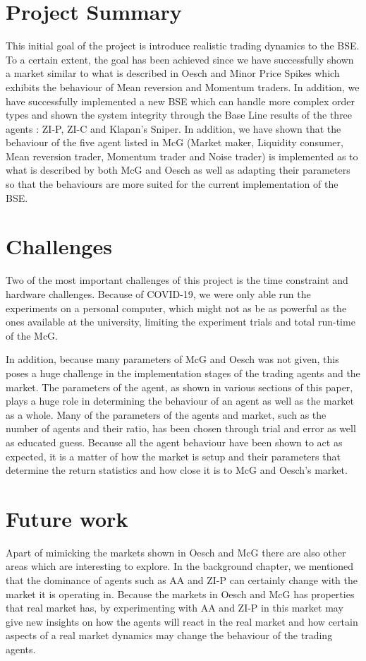 \section{Project Summary}

This initial goal of the project is introduce realistic trading dynamics to the BSE. To a certain extent, the goal has been achieved since we have successfully shown a market similar to what is described in Oesch \cite{Oesch} and Minor Price Spikes which exhibits the behaviour of Mean reversion and Momentum traders. In addition, we have successfully implemented a new BSE which can handle more complex order types and shown the system integrity through the Base Line results of the three agents : ZI-P, ZI-C and Klapan's Sniper. In addition, we have shown that the behaviour of the five agent listed in McG (Market maker, Liquidity consumer, Mean reversion trader, Momentum trader and Noise trader) is implemented as to what is described by both McG and Oesch as well as adapting their parameters so that the behaviours are more suited for the current implementation of the BSE. 

\section{Challenges}
Two of the most important challenges of this project is the time constraint and hardware challenges. Because of COVID-19, we were only able run the experiments on a personal computer, which might not as be as powerful as the ones available at the university, limiting the experiment trials and total run-time of the McG. 

In addition, because many parameters of McG and Oesch was not given, this poses a huge challenge in the implementation stages of the trading agents and the market. The parameters of the agent, as shown in various sections of this paper, plays a huge role in determining the behaviour of an agent as well as the market as a whole. Many of the parameters of the agents and market, such as the number of agents and their ratio, has been chosen through trial and error as well as educated guess. Because all the agent behaviour have been shown to act as expected, it is a matter of how the market is setup and their parameters that determine the return statistics and how close it is to McG and Oesch's market. 

\section{Future work}
Apart of mimicking the markets shown in Oesch and McG there are also other areas which are interesting to explore. In the background chapter, we mentioned that the dominance of agents such as AA and ZI-P can certainly change with the market it is operating in. Because the markets in Oesch and McG has properties that real market has, by experimenting with AA and ZI-P in this market may give new insights on how the agents will react in the real market and how certain aspects of a real market dynamics may change the behaviour of the trading agents. 

